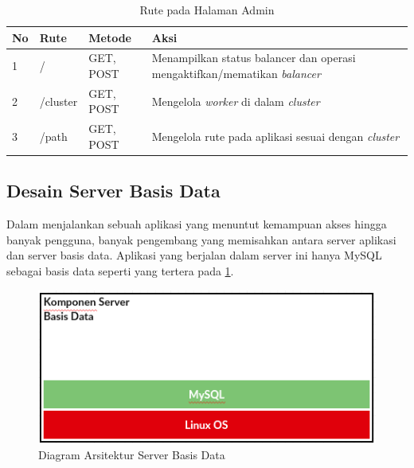 \documentclass{ta-its}
\begin{document}
				\begin{longtable}{|p{}|p{}|p{}|p{}|} %
					
					\caption{Rute pada Halaman Admin} \label{tabelRuteHalamanAdmin} \\
					\hline
					\textbf{No} & \textbf{Rute} & \textbf{Metode} & \textbf{Aksi} \\ \hline
					
					\endhead
					\endfoot
					\endlastfoot
					
					1 & / & GET, POST & Menampilkan status balancer dan operasi mengaktifkan/mematikan \textit{balancer}\\ \hline
					2 & /cluster & GET, POST & Mengelola \textit{worker} di dalam \textit{cluster} \\ \hline
					3 & /path & GET, POST & Mengelola rute pada aplikasi sesuai dengan \textit{cluster} \\ \hline

				\end{longtable}
				
			\subsection{Desain Server Basis Data}
				Dalam menjalankan sebuah aplikasi yang menuntut kemampuan akses hingga banyak pengguna, banyak pengembang yang memisahkan antara server aplikasi dan server basis data. Aplikasi yang berjalan dalam server ini hanya MySQL sebagai basis data seperti yang tertera pada \ref{gambarArsitekturDB}.
			    
				\begin{figure}[h] %
					\centering
					\includegraphics[width=\linewidth]{contoh_img/kompdb}
					\caption{Diagram Arsitektur Server Basis Data}
					\label{gambarArsitekturDB}
				\end{figure}
\end{document}
